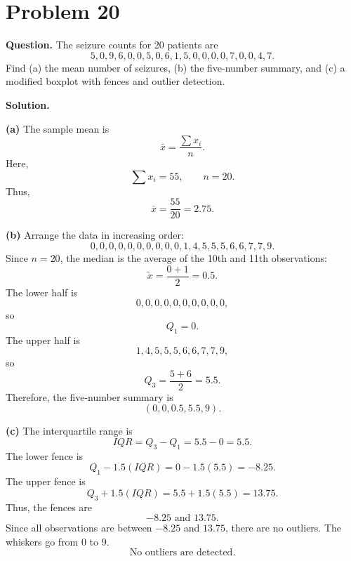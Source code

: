 \documentclass[11pt]{article}
\begin{document}
\section*{Problem 20}

\textbf{Question.} The seizure counts for 20 patients are
\[
5,0,9,6,0,0,5,0,6,1,5,0,0,0,0,7,0,0,4,7.
\]
Find (a) the mean number of seizures, (b) the five-number summary, and (c) a modified boxplot with fences and outlier detection.

\textbf{Solution.}

\textbf{(a)} The sample mean is
\[
\bar x=\frac{\sum x_i}{n}.
\]
Here,
\[
\sum x_i=55, \qquad n=20.
\]
Thus,
\[
\boxed{\bar x=\frac{55}{20}=2.75}.
\]

\textbf{(b)} Arrange the data in increasing order:
\[
0,0,0,0,0,0,0,0,0,0,1,4,5,5,5,6,6,7,7,9.
\]
Since $n=20$, the median is the average of the 10th and 11th observations:
\[
\tilde x=\frac{0+1}{2}=0.5.
\]
The lower half is
\[
0,0,0,0,0,0,0,0,0,0,
\]
so
\[
Q_1=0.
\]
The upper half is
\[
1,4,5,5,5,6,6,7,7,9,
\]
so
\[
Q_3=\frac{5+6}{2}=5.5.
\]
Therefore, the five-number summary is
\[
\boxed{(0,0,0.5,5.5,9)}.
\]

\textbf{(c)} The interquartile range is
\[
IQR=Q_3-Q_1=5.5-0=5.5.
\]
The lower fence is
\[
Q_1-1.5(IQR)=0-1.5(5.5)=-8.25.
\]
The upper fence is
\[
Q_3+1.5(IQR)=5.5+1.5(5.5)=13.75.
\]
Thus, the fences are
\[
\boxed{-8.25\text{ and }13.75}.
\]
Since all observations are between $-8.25$ and $13.75$, there are no outliers. The whiskers go from $0$ to $9$.
\[
\boxed{\text{No outliers are detected.}}
\]

\begin{center}
\end{center}

\newpage
\end{document}
